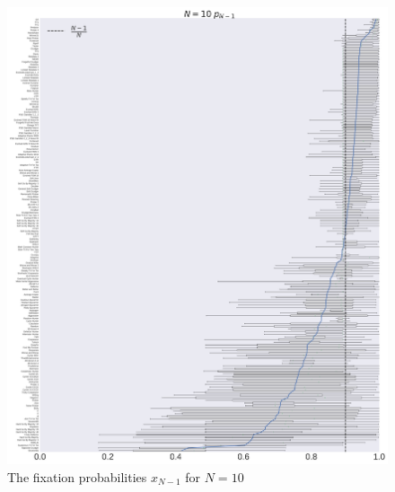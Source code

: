 \documentclass[10pt,letterpaper]{article}
\begin{document}
\begin{figure}[!hbtp]
    \centering
    \includegraphics[width=\textwidth]{./boxplot_10_resist.pdf}
    \caption{The fixation probabilities \(x_{N-1}\) for \(N=10\)}
\end{figure}
\end{document}

